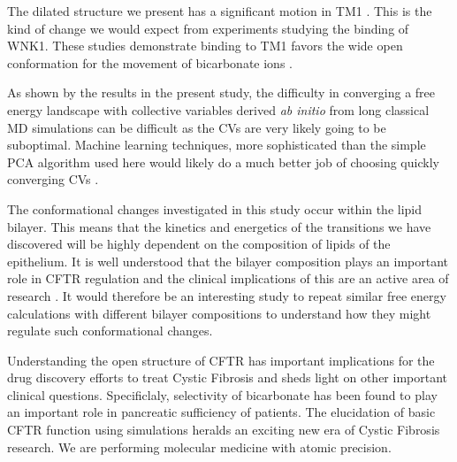 The dilated structure we present has a significant motion in TM1 . This is the kind of change we would expect from experiments studying the binding of WNK1. These studies demonstrate binding to TM1 favors the wide open conformation for the movement of bicarbonate ions \cite{kim2019}. 

As shown by the results in the present study, the difficulty in converging a free energy landscape with collective variables derived \textit {ab initio} from long classical MD simulations can be difficult as the CVs are very likely going to be suboptimal. Machine learning techniques, more sophisticated than the simple PCA algorithm used here would likely do a much better job of choosing quickly converging CVs \cite{}. 

The conformational changes investigated in this study occur within the lipid bilayer. This means that the kinetics and energetics of the transitions we have discovered will be highly dependent on the composition of lipids of the epithelium. It is well understood that the bilayer composition plays an important role in CFTR regulation and the clinical implications of this are an active area of research \cite{cui2020, cottrill2020}. It would therefore be an interesting study to repeat similar free energy calculations with different bilayer compositions to understand how they might regulate such conformational changes.

Understanding the open structure of CFTR has important implications for the drug discovery efforts to treat Cystic Fibrosis and sheds light on other important clinical questions. Specificlaly, selectivity of bicarbonate has been found to play an important role in pancreatic sufficiency of patients. The elucidation of basic CFTR function using simulations heralds an exciting new era of Cystic Fibrosis research. We are performing molecular medicine with atomic precision. 


